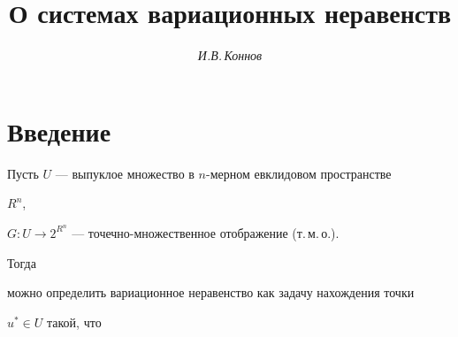 \setcounter{page}{79}












\author{\it И.В.\,Коннов}


\title{О системах вариационных неравенств}





\date{}







\pagestyle{plain} %













\maketitle













\section{Введение}





Пусть $U$ --- выпуклое множество в $n$-мерном евклидовом пространстве


$R^n$,


$G:U\to 2^{R^n}$ --- точечно-множественное отображение (т.\,м.\,о.).


Тогда


можно определить вариационное неравенство как задачу нахождения точки


$u^*\in U$ такой, что


$$



